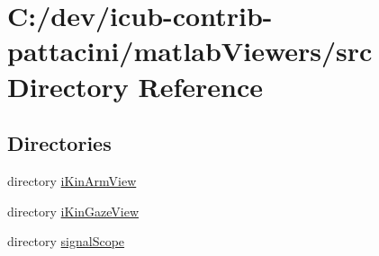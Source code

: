 \section{C\+:/dev/icub-\/contrib-\/pattacini/matlab\+Viewers/src Directory Reference}
\label{dir_36177335618d57f930976cac1ebc0309}
\subsection*{Directories}
\begin{DoxyCompactItemize}
\item 
directory \hyperlink{dir_6c0b00e74841b67bc76176ef829d95db}{i\+Kin\+Arm\+View}
\item 
directory \hyperlink{dir_e6f26a1888492a68dda093a5c1249cf1}{i\+Kin\+Gaze\+View}
\item 
directory \hyperlink{dir_722135a34af0503aff41292762281bbc}{signal\+Scope}
\end{DoxyCompactItemize}
